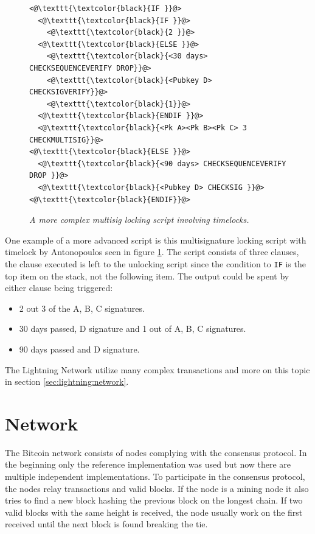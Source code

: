 \begin{figure}[hbt!]
	
	\begin{lstlisting}	
<@\texttt{\textcolor{black}{IF }}@>
  <@\texttt{\textcolor{black}{IF }}@>
    <@\texttt{\textcolor{black}{2 }}@>
  <@\texttt{\textcolor{black}{ELSE }}@>
    <@\texttt{\textcolor{black}{<30 days> CHECKSEQUENCEVERIFY DROP}}@>
    <@\texttt{\textcolor{black}{<Pubkey D> CHECKSIGVERIFY}}@>
    <@\texttt{\textcolor{black}{1}}@>
  <@\texttt{\textcolor{black}{ENDIF }}@>
  <@\texttt{\textcolor{black}{<Pk A><Pk B><Pk C> 3 CHECKMULTISIG}}@>
<@\texttt{\textcolor{black}{ELSE }}@>
  <@\texttt{\textcolor{black}{<90 days> CHECKSEQUENCEVERIFY DROP }}@>
  <@\texttt{\textcolor{black}{<Pubkey D> CHECKSIG }}@>
<@\texttt{\textcolor{black}{ENDIF}}@>

	\end{lstlisting}
	
	\caption{\textit{ A more complex multisig locking script involving timelocks.
	}}
	\label{fig:aantop:multi}
\end{figure}

One example of a more advanced script is this multisignature locking script with timelock by Antonopoulos seen in figure \ref{fig:aantop:multi}\cite{antonopoulos:bitcoin:scripting}. The script consists of three clauses, the clause executed is left to the unlocking script since the condition to \texttt{IF} is the top item on the stack, not the following item. The output could be spent by either clause being triggered:
\begin{itemize}
	\item 2 out 3 of the A, B, C signatures.
	\item 30 days passed, D signature and 1 out of A, B, C signatures.
	\item 90 days passed and D signature.
\end{itemize} 

The Lightning Network utilize many complex transactions and more on this topic in section \ref{sec:lightning:network}.

\section{Network}

The Bitcoin network consists of nodes complying with the consensus protocol. In the beginning only the reference implementation was used but now there are multiple independent implementations\cite{repository:bitcoin}\cite{repository:btcd}\cite{repository:neutrino}. To participate in the consensus protocol, the nodes relay transactions and valid blocks. If the node is a mining node it also tries to find a new block hashing the previous block on the longest chain. If two valid blocks with the same height is received, the node usually work on the first received until the next block is found breaking the tie. 


